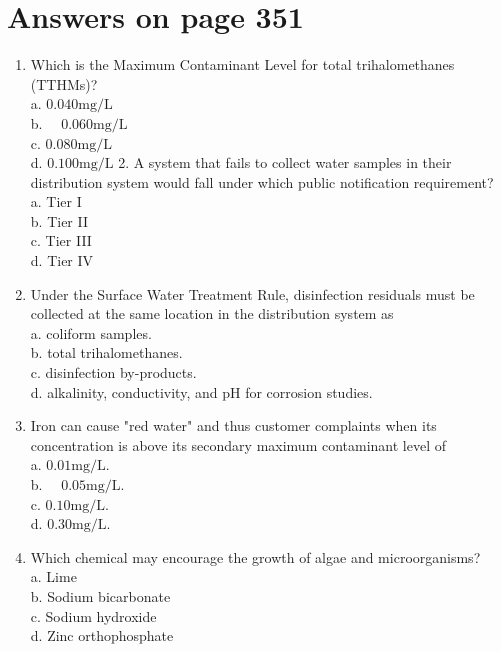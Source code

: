 \documentclass[10pt]{article}
\begin{document}
\section{Answers on page 351}
\begin{enumerate}
  \item Which is the Maximum Contaminant Level for total trihalomethanes (TTHMs)?\\
a. $0.040 \mathrm{mg} / \mathrm{L}$\\
b. $\quad 0.060 \mathrm{mg} / \mathrm{L}$\\
c. $0.080 \mathrm{mg} / \mathrm{L}$\\
d. $0.100 \mathrm{mg} / \mathrm{L}$ 2. A system that fails to collect water samples in their distribution system would fall under which public notification requirement?\\
a. Tier I\\
b. Tier II\\
c. Tier III\\
d. Tier IV

  \item Under the Surface Water Treatment Rule, disinfection residuals must be collected at the same location in the distribution system as\\
a. coliform samples.\\
b. total trihalomethanes.\\
c. disinfection by-products.\\
d. alkalinity, conductivity, and $\mathrm{pH}$ for corrosion studies.

  \item Iron can cause "red water" and thus customer complaints when its concentration is above its secondary maximum contaminant level of\\
a. $0.01 \mathrm{mg} / \mathrm{L}$.\\
b. $\quad 0.05 \mathrm{mg} / \mathrm{L}$.\\
c. $0.10 \mathrm{mg} / \mathrm{L}$.\\
d. $0.30 \mathrm{mg} / \mathrm{L}$.

  \item Which chemical may encourage the growth of algae and microorganisms?\\
a. Lime\\
b. Sodium bicarbonate\\
c. Sodium hydroxide\\
d. Zinc orthophosphate

\end{enumerate}
\end{document}
